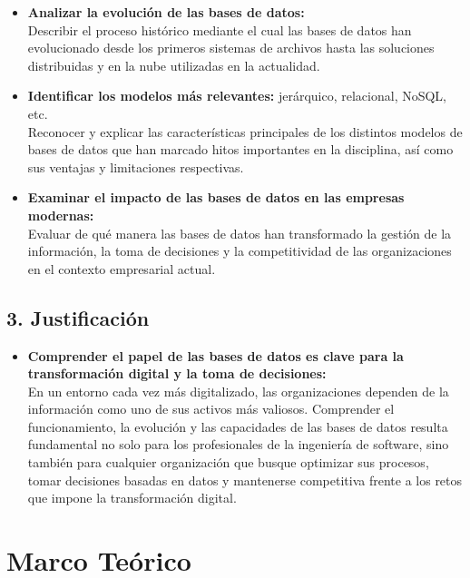 \documentclass[12pt,a4paper]{article}
\begin{document}
\begin{itemize}
  \item \textbf{Analizar la evolución de las bases de datos:} \\
  Describir el proceso histórico mediante el cual las bases de datos han evolucionado desde los primeros sistemas de archivos hasta las soluciones distribuidas y en la nube utilizadas en la actualidad.

  \item \textbf{Identificar los modelos más relevantes:} jerárquico, relacional, NoSQL, etc. \\
  Reconocer y explicar las características principales de los distintos modelos de bases de datos que han marcado hitos importantes en la disciplina, así como sus ventajas y limitaciones respectivas.

  \item \textbf{Examinar el impacto de las bases de datos en las empresas modernas:} \\
  Evaluar de qué manera las bases de datos han transformado la gestión de la información, la toma de decisiones y la competitividad de las organizaciones en el contexto empresarial actual.
\end{itemize}

\subsection*{3. Justificación}

\begin{itemize}
  \item \textbf{Comprender el papel de las bases de datos es clave para la transformación digital y la toma de decisiones:} \\
  En un entorno cada vez más digitalizado, las organizaciones dependen de la información como uno de sus activos más valiosos. Comprender el funcionamiento, la evolución y las capacidades de las bases de datos resulta fundamental no solo para los profesionales de la ingeniería de software, sino también para cualquier organización que busque optimizar sus procesos, tomar decisiones basadas en datos y mantenerse competitiva frente a los retos que impone la transformación digital.
\end{itemize}

\section{Marco Teórico}
\end{document}
